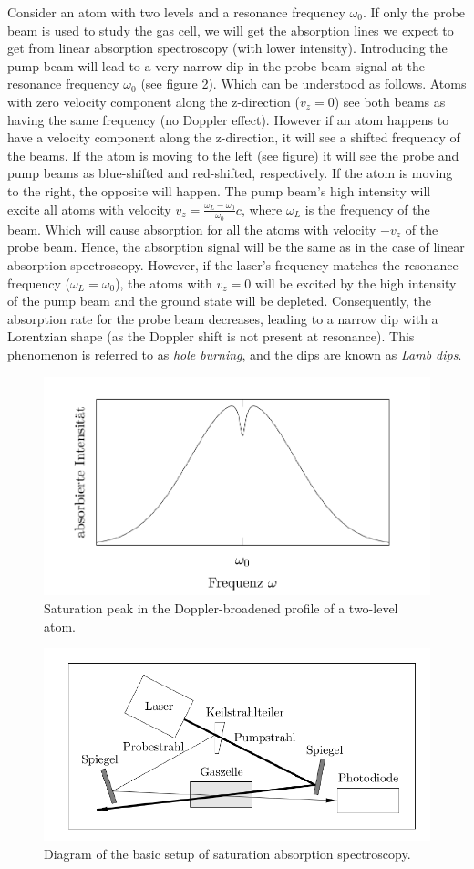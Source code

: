 \documentclass{article}
\begin{document}
Consider an atom with two levels and a resonance frequency $\omega_0$. If only the probe beam is used to study the gas cell, we will get the absorption lines we expect to get from linear absorption spectroscopy (with lower intensity). Introducing the pump beam will lead to a very narrow dip in the probe beam signal at the resonance frequency $\omega_0$ (see figure 2). Which can be understood as follows. Atoms with zero velocity component along the z-direction ($v_z = 0$) see both beams as having the same frequency (no Doppler effect). However if an atom happens to have a velocity component along the z-direction, it will see  a shifted frequency of the beams. If the atom is moving to the left (see figure) it will see the probe and pump beams as blue-shifted and red-shifted, respectively. If the atom is moving to the right, the opposite will happen. The pump beam's high intensity will excite all atoms with velocity $v_z = \frac{\omega_L - \omega_0}{\omega_0}c$, where $\omega_L$ is the frequency of the beam. Which will cause absorption for all the atoms with velocity $-v_z$ of the probe beam. Hence, the absorption signal will be the same as in the case of linear absorption spectroscopy. However, if the laser's frequency matches the resonance frequency ($\omega_L = \omega_0$), the atoms with $v_z =0$ will be excited by the high intensity of the pump beam and the ground state will be depleted. Consequently, the absorption rate for the probe beam decreases, leading to a narrow dip with a Lorentzian shape (as the Doppler shift is not present at resonance). This phenomenon is referred to as \textit{hole burning}, and the dips are known as \textit{Lamb dips}.
\begin{figure}[h]
    \centering
    \includegraphics[width=0.5\linewidth]{Figures/3.png}
    \caption{Saturation peak in the Doppler-broadened profile of a two-level atom.}
    \label{fig:enter-label}
\end{figure}
\begin{figure}[h]
    \centering
    \includegraphics[width=0.5\linewidth]{Figures/2.png}
    \caption{Diagram of the basic setup of saturation absorption spectroscopy.}
    \label{fig:enter-label}
\end{figure}
\end{document}
